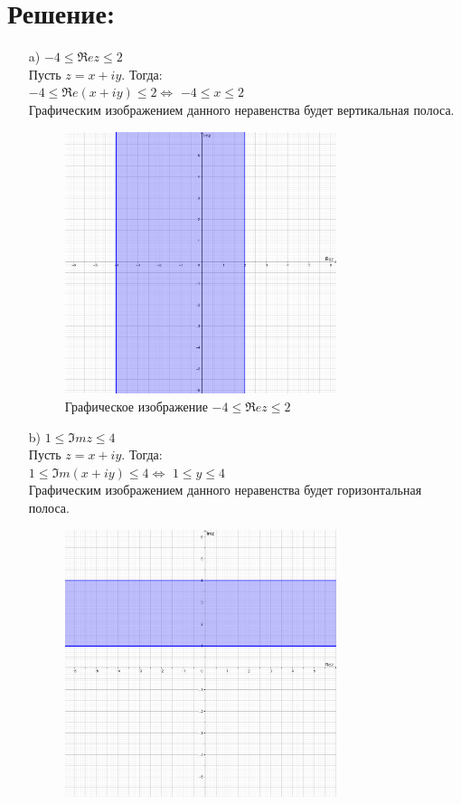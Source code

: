 \documentclass[12pt, a4paper]{article}
\begin{document}
    \section*{Решение:}
    \begin{enumerate}
        \item [a)] $-4 \leq \Re ez \leq 2$\\
        Пусть $z = x + iy$. Тогда:\\
        $-4 \leq \Re e(x + iy) \leq 2 \Leftrightarrow$
        $-4 \leq x \leq 2$\\
        Графическим изображением данного неравенства будет вертикальная полоса.
        \begin{figure}[h]
            \centering
            \includegraphics[width=0.75\textwidth]{task4-a.png}
            \caption{Графическое изображение $-4 \leq \Re ez \leq 2$}
        \end{figure}\newpage
        \item [b)] $1 \leq \Im mz \leq 4$\\
        Пусть $z = x + iy$. Тогда:\\
        $1 \leq \Im m(x + iy) \leq 4 \Leftrightarrow$
        $1 \leq y \leq 4$\\
        Графическим изображением данного неравенства будет горизонтальная полоса.\\
        \begin{figure}[h]
            \centering
            \includegraphics[width=0.75\textwidth]{task4-b.png}

\end{figure}
\end{enumerate}
\end{document}
